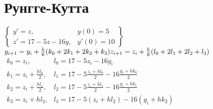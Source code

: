 \documentclass{article}
\begin{document}
\section{Рунгге-Кутта}
\begin{math}
\left\{ 
\begin{array}{cc}
  y' = z,             & y(0) = 5 \\ 
  z' = 17 - 5z - 16y, & y'(0) = 10
\end{array}
\right\}
\end{math}\\
\begin{math}
  y_{i+1} = y_i + \frac{h}{6} (k_0 + 2k_1 + 2k_2 + k_3)\\
  z_{i+1} = z_i + \frac{h}{6} (l_0 + 2l_1 + 2l_2 + l_3)
\end{math} 
\\
\begin{math}
\begin{array}{rl}
  k_0 = z_i,                  & l_0 = 17 - 5z_i - 16y_i \\ 
  k_1 = z_i + \frac{hl_0}{2}, & l_1 = 17 - 5\frac{z_i + hl_0}{2} - 16\frac{y_i +  hk_0}{2} \\
  k_2 = z_i + \frac{hl_1}{2}, & l_2 = 17 - 5\frac{z_i + hl_1}{2} - 16\frac{y_i +  hk_1}{2} \\
  k_3 = z_i + hl_2,           & l_3 = 17 - 5(z_i + hl_2) - 16(y_i + hk_2)\\
\end{array}
\end{math} \\
\end{document}
